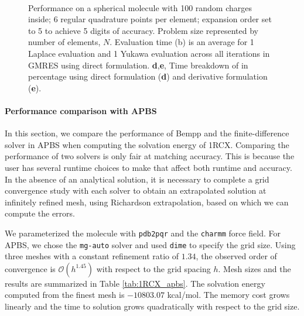 \begin{figure*}[t]
\centering
    \\
    \caption{Performance on a spherical molecule with 100 random charges inside;
    6 regular quadrature points per element; \fmm expansion order set to 5 to achieve 5 digits of accuracy. Problem size represented by number of elements, $N$. Evaluation time (b) is an average for 1 Laplace \fmm evaluation and 1 Yukawa \fmm evaluation across all iterations in GMRES using direct formulation.
    \textbf{d},\textbf{e}, Time breakdown of \gmres in percentage using direct formulation (\textbf{d}) and derivative formulation (\textbf{e}).}
\end{figure*}

\paragraph{Performance comparison with APBS} \label{result_comparison_apbs}
In this section, we compare the performance of Bempp and the finite-difference solver in APBS when computing the solvation energy of 1RCX.
Comparing the performance of two solvers is only fair at matching accuracy.
This is because the user has several runtime choices to make that affect both runtime and accuracy.
In the absence of an analytical solution, it is necessary to complete a grid convergence study with each solver to obtain an extrapolated solution at infinitely refined mesh, using Richardson extrapolation, based on which we can compute the errors.

We parameterized the molecule with \texttt{pdb2pqr} and the \texttt{charmm} force field. 
For APBS, we chose the \texttt{mg-auto} solver and used \texttt{dime} to specify the grid size.
Using three meshes with a constant refinement ratio of $1.34$, the observed order of convergence is $\mathcal{O}(h^{1.45})$ with respect to the grid spacing $h$.
Mesh sizes and the results are summarized in Table \ref{tab:1RCX_apbs}.
The solvation energy computed from the finest mesh is $-10803.07$ kcal/mol.
The memory cost grows linearly and the time to solution grows quadratically with respect to the grid size.

